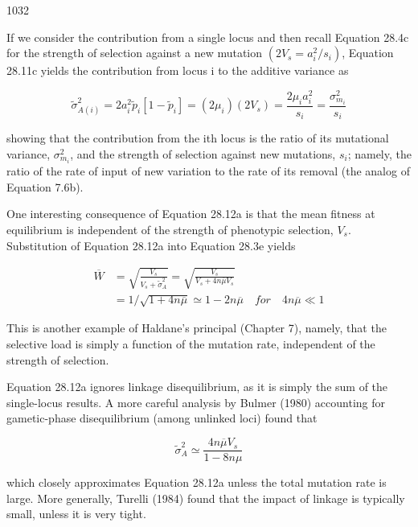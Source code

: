 \documentclass{article}
\begin{document}
1032

If we consider the contribution from a single locus and then recall Equation 28.4c for the strength of selection against a new mutation  $ (2V_s = a_i^2/s_i) $, Equation 28.11c yields the contribution from locus i to the additive variance as

\begin{equation}
\widetilde{\sigma}_{A(i)}^{2}=2a_{i}^{2}\widetilde{p}_{i}[1-\widetilde{p}_{i}]=(2\mu_{i})(2V_{s})=\frac{2\mu_{i}a_{i}^{2}}{s_{i}}=\frac{\sigma_{m_{i}}^{2}}{s_{i}}
\tag{28.12b}
\label{eq:28_12b}
\end{equation}

showing that the contribution from the ith locus is the ratio of its mutational variance,  $ \sigma_{m_i}^2 $, and the strength of selection against new mutations,  $ s_i $; namely, the ratio of the rate of input of new variation to the rate of its removal (the analog of Equation 7.6b).

One interesting consequence of Equation 28.12a is that the mean fitness at equilibrium is independent of the strength of phenotypic selection,  $ V_{s} $. Substitution of Equation 28.12a into Equation 28.3e yields

\begin{equation}
\begin{aligned}\overline{W}&=\sqrt{\frac{V_{s}}{V_{s}+\widetilde{\sigma}_{A}^{2}}}=\sqrt{\frac{V_{s}}{V_{s}+4n\overline{\mu}V_{s}}}\\&=1/\sqrt{1+4n\overline{\mu}}\simeq1-2n\overline{\mu}\quad for\quad4n\overline{\mu}\ll1\end{aligned}
\tag{28.12c}
\label{eq:28_12c}
\end{equation}

This is another example of Haldane’s principal (Chapter 7), namely, that the selective load is simply a function of the mutation rate, independent of the strength of selection.

Equation 28.12a ignores linkage disequilibrium, as it is simply the sum of the single-locus results. A more careful analysis by Bulmer (1980) accounting for gametic-phase disequilibrium (among unlinked loci) found that

\begin{equation}
\widetilde{\sigma}_{A}^{2}\simeq\frac{4n\overline{\mu}V_{s}}{1-8n\mu}
\tag{28.12d}
\label{eq:28_12d}
\end{equation}

which closely approximates Equation 28.12a unless the total mutation rate is large. More generally, Turelli (1984) found that the impact of linkage is typically small, unless it is very tight.
\end{document}
